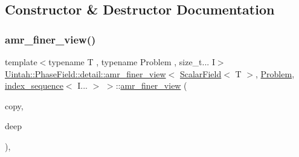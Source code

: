 \subsection{Constructor \& Destructor Documentation}
\mbox{\label{classUintah_1_1PhaseField_1_1detail_1_1amr__finer__view_3_01ScalarField_3_01T_01_4_00_01Problem_810ae3f886a4d3bdb2b37c629369a2ec_a3836d284166d8899b18d17a4f37d1852}} 
\subsubsection{\texorpdfstring{amr\+\_\+finer\+\_\+view()}{amr\_finer\_view()}\hspace{0.1cm}{\footnotesize\ttfamily [1/4]}}
{\footnotesize\ttfamily template$<$typename T , typename Problem , size\+\_\+t... I$>$ \\
\hyperlink{classUintah_1_1PhaseField_1_1detail_1_1amr__finer__view}{Uintah\+::\+Phase\+Field\+::detail\+::amr\+\_\+finer\+\_\+view}$<$ \hyperlink{structUintah_1_1PhaseField_1_1ScalarField}{Scalar\+Field}$<$ T $>$, \hyperlink{classUintah_1_1PhaseField_1_1Problem}{Problem}, \hyperlink{namespaceUintah_1_1PhaseField_a237de804d99512e50613aff7c94a9461}{index\+\_\+sequence}$<$ I... $>$ $>$\+::\hyperlink{classUintah_1_1PhaseField_1_1detail_1_1amr__finer__view}{amr\+\_\+finer\+\_\+view} (\begin{DoxyParamCaption}\item[{const \hyperlink{classUintah_1_1PhaseField_1_1detail_1_1amr__finer__view}{amr\+\_\+finer\+\_\+view}$<$ \hyperlink{structUintah_1_1PhaseField_1_1ScalarField}{Scalar\+Field}$<$ T $>$, \hyperlink{classUintah_1_1PhaseField_1_1Problem}{Problem}, \hyperlink{namespaceUintah_1_1PhaseField_a237de804d99512e50613aff7c94a9461}{index\+\_\+sequence}$<$ I... $>$ $>$ $\ast$}]{copy,  }\item[{bool}]{deep }\end{DoxyParamCaption})\hspace{0.3cm}{\ttfamily [inline]}, {\ttfamily [protected]}}



